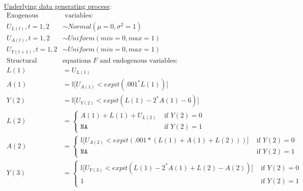 \documentclass[answers]{exam}
\begin{document}
\underline{Underlying data generating process}:
\begin{align*}
\text{Exogenous} & \text{ variables:} \\
U_{L(t)}, t = 1, 2 &\sim Normal(\mu = 0, \sigma^2 = 1) \\
U_{A(t)}, t = 1, 2 &\sim Uniform(min = 0, max = 1) \\
U_{Y(t+1)}, t = 1, 2 & \sim Uniform(min = 0, max = 1) \\
\text{Structural } & \text{equations $F$ and endogenous variables:}  \\
L(1) &= U_{L(1)} \\
A(1) & = \mathbb{I} \big[ U_{A(1)} < expit(.001^*L(1)) \big] \\
Y(2) &= \mathbb{I} \big[U_{Y(2)} < expit(L(1) - 2^*A(1) - 6) \big] \\
L(2) &= 
    \begin{cases}
      A(1) + L(1) + U_{L(2)} & \text{ if } Y(2) = 0\ \\
      \texttt{NA} & \text{ if } Y(2) = 1
    \end{cases} \\
A(2) &= 
    \begin{cases}
      \mathbb{I} \big[ U_{A(2)} < expit(.001*(L(1) + A(1) + L(2))) \big]  & \text{ if } Y(2) = 0\ \\
      \texttt{NA} & \text{ if } Y(2) = 1
    \end{cases} \\
Y(3) &=  
    \begin{cases}
      \mathbb{I} \big[ U_{Y(3)} < expit(L(1) - 2^*A(1) + L(2) - A(2)) \big] & \text{ if } Y(2) = 0\ \\
      1 & \text{ if } Y(2) = 1
    \end{cases} \\
\end{align*}
\end{document}
